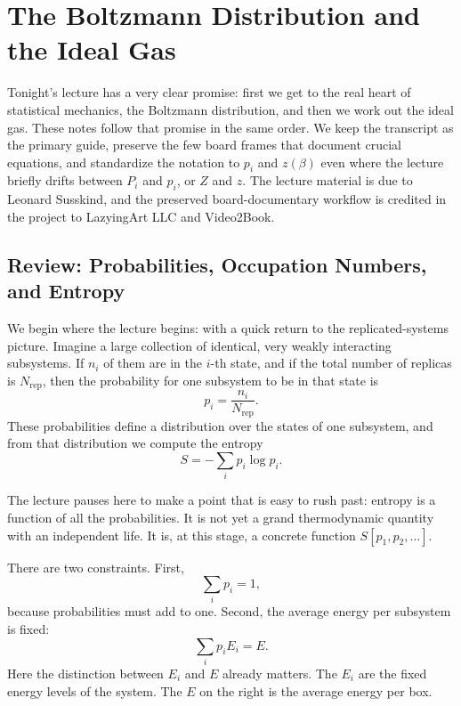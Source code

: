 \chapter{The Boltzmann Distribution and the Ideal Gas}

Tonight's lecture has a very clear promise: first we get to the real heart of statistical mechanics, the Boltzmann distribution, and then we work out the ideal gas. These notes follow that promise in the same order. We keep the transcript as the primary guide, preserve the few board frames that document crucial equations, and standardize the notation to \(p_i\) and \(z(\beta)\) even where the lecture briefly drifts between \(P_i\) and \(p_i\), or \(Z\) and \(z\). The lecture material is due to Leonard Susskind, and the preserved board-documentary workflow is credited in the project to LazyingArt LLC and Video2Book.

\section{Review: Probabilities, Occupation Numbers, and Entropy}

We begin where the lecture begins: with a quick return to the replicated-systems picture. Imagine a large collection of identical, very weakly interacting subsystems. If \(n_i\) of them are in the \(i\)-th state, and if the total number of replicas is \(N_{\mathrm{rep}}\), then the probability for one subsystem to be in that state is
\begin{equation}
p_i=\frac{n_i}{N_{\mathrm{rep}}}.
\end{equation}
These probabilities define a distribution over the states of one subsystem, and from that distribution we compute the entropy
\begin{equation}
S=-\sum_i p_i\log p_i.
\end{equation}

The lecture pauses here to make a point that is easy to rush past: entropy is a function of all the probabilities. It is not yet a grand thermodynamic quantity with an independent life. It is, at this stage, a concrete function \(S[p_1,p_2,\dots]\).

There are two constraints. First,
\begin{equation}
\sum_i p_i=1,
\end{equation}
because probabilities must add to one. Second, the average energy per subsystem is fixed:
\begin{equation}
\sum_i p_i E_i = E.
\end{equation}
Here the distinction between \(E_i\) and \(E\) already matters. The \(E_i\) are the fixed energy levels of the system. The \(E\) on the right is the average energy per box.

